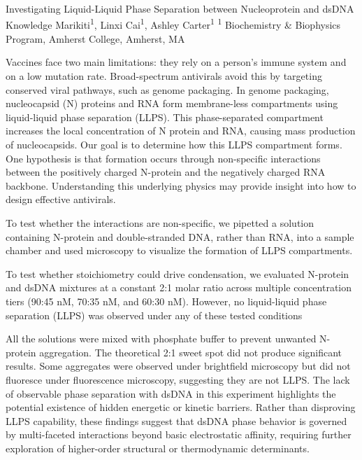 \makeabstract
    {
     Investigating Liquid-Liquid Phase Separation between Nucleoprotein and dsDNA 
    }
    {
    Knowledge Marikiti\textsuperscript{1}, Linxi Cai\textsuperscript{1}, Ashley Carter\textsuperscript{1}
    }
    {
    \textsuperscript{1} Biochemistry \& Biophysics Program, Amherst College, Amherst, MA
    }
    {
    Vaccines face two main limitations: they rely on a person{\textquoteright}s immune system and on a low mutation rate. Broad-spectrum antivirals avoid this by targeting conserved viral pathways, such as genome packaging. In genome packaging, nucleocapsid (N) proteins and RNA form membrane-less compartments using liquid-liquid phase separation (LLPS). This phase-separated compartment increases the local concentration of N protein and RNA, causing mass production of nucleocapsids. Our goal is to determine how this LLPS compartment forms. One hypothesis is that formation occurs through non-specific interactions between the positively charged N-protein and the negatively charged RNA backbone. Understanding this underlying physics may provide insight into how to design effective antivirals.

    }
    {
    To test whether the interactions are non-specific, we pipetted a solution containing N-protein and double-stranded DNA, rather than RNA, into a sample chamber and used microscopy to visualize the formation of LLPS compartments.

    }
    {
    To test whether stoichiometry could drive condensation, we evaluated N-protein and dsDNA mixtures at a constant 2:1 molar ratio across multiple concentration tiers (90:45 nM, 70:35 nM, and 60:30 nM). However, no liquid-liquid phase separation (LLPS) was observed under any of these tested conditions 
    }
    {
     All the solutions were mixed with phosphate buffer to prevent unwanted N-protein aggregation. The theoretical 2:1 sweet spot did not produce significant results. Some aggregates were observed under brightfield microscopy but did not fluoresce under fluorescence microscopy, suggesting they are not LLPS. The lack of observable phase separation with dsDNA in this experiment highlights the potential existence of hidden energetic or kinetic barriers. Rather than disproving LLPS capability, these findings suggest that dsDNA phase behavior is governed by multi-faceted interactions beyond basic electrostatic affinity, requiring further exploration of higher-order structural or thermodynamic determinants. 

    }

    \newpage
    